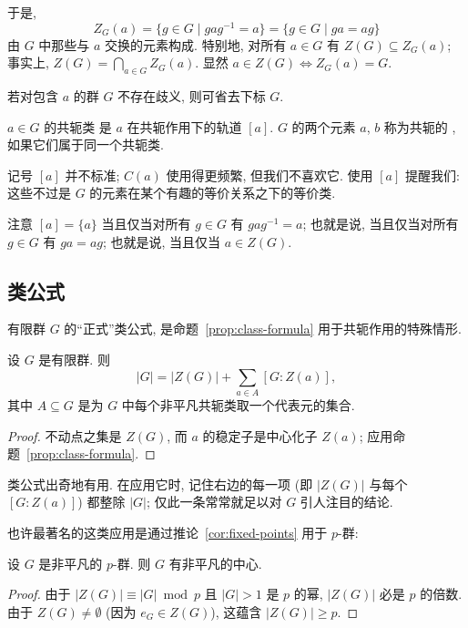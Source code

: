 于是,
\[
Z_G(a) = \{g \in G \mid gag^{-1} = a\} = \{g \in G \mid ga = ag\}
\]
由 $G$ 中那些与 $a$ 交换的元素构成. 特别地, 对所有 $a \in G$ 有 $Z(G) \subseteq Z_G(a)$; 事实上, $Z(G) = \bigcap_{a \in G} Z_G(a)$. 显然 $a \in Z(G) \iff Z_G(a) = G$.

若对包含 $a$ 的群 $G$ 不存在歧义, 则可省去下标 $G$.

\begin{definition}
\label{def:conjugacy-class}
$a \in G$ 的共轭类%
是 $a$ 在共轭作用下的轨道 $[a]$. $G$ 的两个元素 $a$, $b$ 称为共轭的%
, 如果它们属于同一个共轭类.
\end{definition}

记号 $[a]$ 并不标准; $C(a)$ 使用得更频繁, 但我们不喜欢它. 使用 $[a]$ 提醒我们: 这些不过是 $G$ 的元素在某个有趣的等价关系之下的等价类.

注意 $[a] = \{a\}$ 当且仅当对所有 $g \in G$ 有 $gag^{-1} = a$; 也就是说, 当且仅当对所有 $g \in G$ 有 $ga = ag$; 也就是说, 当且仅当 $a \in Z(G)$.

\subsection{类公式}
\label{subsec:class-formula}

有限群 $G$ 的``正式''类公式, 是命题~\ref{prop:class-formula} 用于共轭作用的特殊情形.

\begin{proposition}[类公式]
\label{prop:class-formula-conj}
设 $G$ 是有限群. 则
\[
|G| = |Z(G)| + \sum_{a \in A} [G:Z(a)],
\]
其中 $A \subseteq G$ 是为 $G$ 中每个非平凡共轭类取一个代表元的集合.
\end{proposition}

\begin{proof}
不动点之集是 $Z(G)$, 而 $a$ 的稳定子是中心化子 $Z(a)$; 应用命题~\ref{prop:class-formula}.
\end{proof}

类公式出奇地有用. 在应用它时, 记住右边的每一项 (即 $|Z(G)|$ 与每个 $[G:Z(a)]$) 都整除 $|G|$; 仅此一条常常就足以对 $G$ 引人注目的结论.

也许最著名的这类应用是通过推论~\ref{cor:fixed-points} 用于 $p$-群:

\begin{corollary}
\label{cor:p-group-center}
设 $G$ 是非平凡的 $p$-群. 则 $G$ 有非平凡的中心.
\end{corollary}

\begin{proof}
由于 $|Z(G)| \equiv |G| \bmod p$ 且 $|G| > 1$ 是 $p$ 的幂, $|Z(G)|$ 必是 $p$ 的倍数. 由于 $Z(G) \neq \emptyset$ (因为 $e_G \in Z(G)$), 这蕴含 $|Z(G)| \geq p$.
\end{proof}

